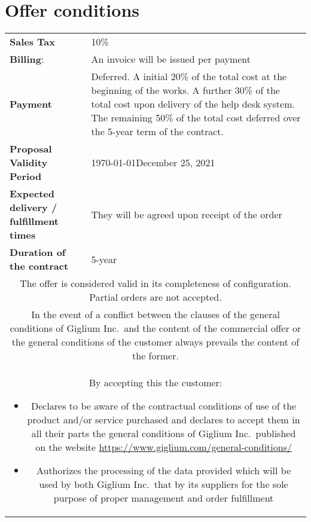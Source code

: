 
\clearpage
\renewcommand{\arraystretch}{2.7}
\section{Offer conditions}
\begin{table}[H]
	\centering 
	\begin{tabularx}{\linewidth}{|XX|}
		\hline
		\textbf{Sales Tax}  &    10\%\\
		\textbf{Billing}: & An invoice will be issued per payment  \\
		\textbf{Payment} & Deferred. A initial 20\% of the total cost at the beginning of the works. A further 30\% of the total cost upon delivery of the help desk system. The remaining 50\% of the total cost deferred over the 5-year term of the contract. \\
		\textbf{Proposal Validity Period} & \today\text{ to }December 25, 2021 \\
		\textbf{Expected delivery / fulfillment times} & They will be agreed upon receipt of the order \\
		\textbf{Duration of the contract} & 5-year\\
		
		\multicolumn{2}{|c|}{\parbox{15 cm}{The offer is considered valid in its completeness of configuration. Partial orders are not accepted.\bigskip}}\\

		\multicolumn{2}{|c|}{\parbox{15 cm}{In the event of a conflict between the clauses of the general conditions of Giglium Inc.\ and the content of the commercial offer or the general conditions of the customer always prevails the content of the former.\bigskip}}\\
		
		\multicolumn{2}{|c|}{\parbox{15 cm}{By accepting this the customer:
			\begin{itemize}
				\item Declares to be aware of the contractual conditions of use of the product and/or service purchased and declares to accept them in all their parts the general conditions of Giglium Inc.\  published on the website \url{https://www.giglium.com/general-conditions/}
				\item Authorizes the processing of the data provided which will be used by both Giglium Inc.\ that by its suppliers for the sole purpose of proper management and order fulfillment
			\end{itemize}
		}}\\

		\hline
	\end{tabularx}
\end{table}
\renewcommand{\arraystretch}{1}